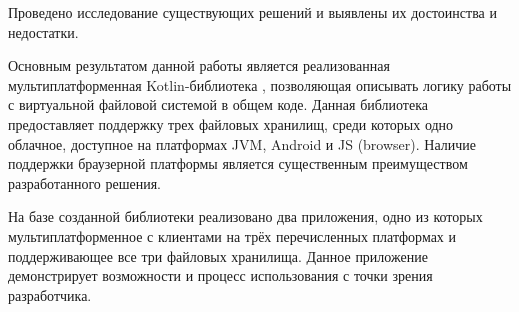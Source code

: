 

Проведено исследование существующих решений и выявлены их достоинства и недостатки.

Основным результатом данной работы является реализованная мультиплатформенная Kotlin-библиотека , позволяющая описывать логику работы с виртуальной файловой системой в общем коде. Данная библиотека предоставляет поддержку трех файловых хранилищ, среди которых одно облачное, доступное на платформах JVM, Android и JS (browser). Наличие поддержки браузерной платформы является существенным преимуществом разработанного решения.

На базе созданной библиотеки реализовано два приложения, одно из которых мультиплатформенное с клиентами на трёх перечисленных платформах и поддерживающее все три файловых хранилища. Данное приложение демонстрирует возможности и процесс использования  с точки зрения разработчика.
